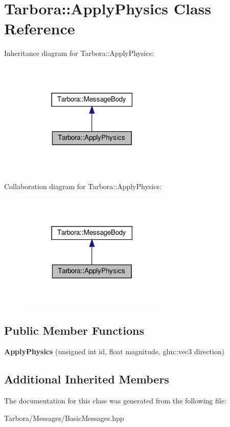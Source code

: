 \hypertarget{classTarbora_1_1ApplyPhysics}{}\section{Tarbora\+:\+:Apply\+Physics Class Reference}
\label{classTarbora_1_1ApplyPhysics}


Inheritance diagram for Tarbora\+:\+:Apply\+Physics\+:
\nopagebreak
\begin{figure}[H]
\begin{center}
\leavevmode
\includegraphics[width=198pt]{classTarbora_1_1ApplyPhysics__inherit__graph}
\end{center}
\end{figure}


Collaboration diagram for Tarbora\+:\+:Apply\+Physics\+:
\nopagebreak
\begin{figure}[H]
\begin{center}
\leavevmode
\includegraphics[width=198pt]{classTarbora_1_1ApplyPhysics__coll__graph}
\end{center}
\end{figure}
\subsection*{Public Member Functions}
\begin{DoxyCompactItemize}
\item 
\mbox{\label{classTarbora_1_1ApplyPhysics_af65460192f54355105775681a41fbc1f}} 
{\bfseries Apply\+Physics} (unsigned int id, float magnitude, glm\+::vec3 direction)
\end{DoxyCompactItemize}
\subsection*{Additional Inherited Members}


The documentation for this class was generated from the following file\+:\begin{DoxyCompactItemize}
\item 
Tarbora/\+Messages/Basic\+Messages.\+hpp\end{DoxyCompactItemize}
